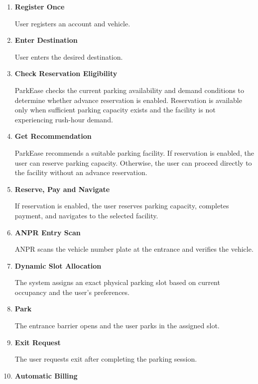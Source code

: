 \documentclass[12pt,a4paper]{article}
\begin{document}
\begin{enumerate}
    \item \textbf{Register Once}
    
    User registers an account and vehicle.

    \item \textbf{Enter Destination}
    
    User enters the desired destination.

    \item \textbf{Check Reservation Eligibility}
    
    ParkEase checks the current parking availability and demand conditions to determine whether advance reservation is enabled. Reservation is available only when sufficient parking capacity exists and the facility is not experiencing rush-hour demand.

    \item \textbf{Get Recommendation}
    
    ParkEase recommends a suitable parking facility. If reservation is enabled, the user can reserve parking capacity. Otherwise, the user can proceed directly to the facility without an advance reservation.

    \item \textbf{Reserve, Pay and Navigate}
    
    If reservation is enabled, the user reserves parking capacity, completes payment, and navigates to the selected facility.

    \item \textbf{ANPR Entry Scan}
    
    ANPR scans the vehicle number plate at the entrance and verifies the vehicle.

    \item \textbf{Dynamic Slot Allocation}
    
    The system assigns an exact physical parking slot based on current occupancy and the user's preferences.

    \item \textbf{Park}
    
    The entrance barrier opens and the user parks in the assigned slot.

    \item \textbf{Exit Request}
    
    The user requests exit after completing the parking session.

    \item \textbf{Automatic Billing}
    

\end{enumerate}
\end{document}
